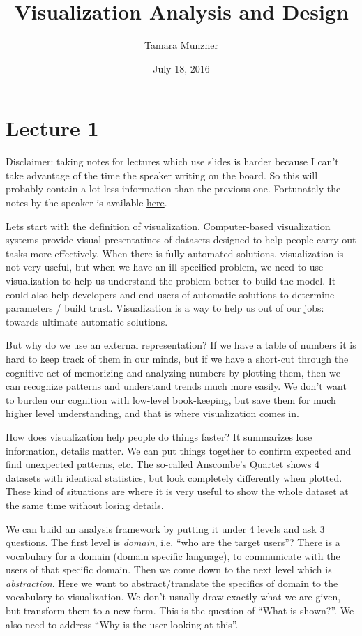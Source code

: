 \documentclass[letterpaper, 11pt]{article}
\numberwithin{equation}{section}
\numberwithin{figure}{section}
\begin{document}
\title{Visualization Analysis and Design}
\author{Tamara Munzner}
\date{July 18, 2016}

\maketitle

\section{Lecture 1}
\label{sec:lec1}

Disclaimer: taking notes for lectures which use slides is harder because I can't
take advantage of the time the speaker writing on the board. So this will
probably contain a lot less information than the previous one. Fortunately the
notes by the speaker is available
\href{http://www.cs.ubc.ca/~tmm/talks.html#vad16pitp}{here}.

Lets start with the definition of visualization. Computer-based visualization
systems provide visual presentatinos of datasets designed to help people carry
out tasks more effectively. When there is fully automated solutions,
visualization is not very useful, but when we have an ill-specified problem, we
need to use visualization to help us understand the problem better to build the
model. It could also help developers and end users of automatic solutions to
determine parameters / build trust. Visualization is a way to help us out of our
jobs: towards ultimate automatic solutions.

But why do we use an external representation? If we have a table of numbers it
is hard to keep track of them in our minds, but if we have a short-cut through
the cognitive act of memorizing and analyzing numbers by plotting them, then we
can recognize patterns and understand trends much more easily. We don't want to
burden our cognition with low-level book-keeping, but save them for much higher
level understanding, and that is where visualization comes in.

How does visualization help people do things faster? It summarizes lose
information, details matter. We can put things together to confirm expected and
find unexpected patterns, etc. The so-called Anscombe's Quartet shows 4 datasets
with identical statistics, but look completely differently when plotted. These
kind of situations are where it is very useful to show the whole dataset at the
same time without losing details.

We can build an analysis framework by putting it under 4 levels and ask 3
questions. The first level is \emph{domain}, i.e. ``who are the target users''?
There is a vocabulary for a domain (domain specific language), to communicate
with the users of that specific domain. Then we come down to the next level
which is \emph{abstraction}. Here we want to abstract/translate the specifics of
domain to the vocabulary to visualization. We don't usually draw exactly what we
are given, but transform them to a new form. This is the question of ``What is
shown?''. We also need to address ``Why is the user looking at this''.
\end{document}
